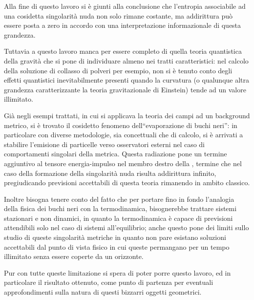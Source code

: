 Alla fine di questo  lavoro  si \`e giunti alla conclusione che l'entropia associabile ad una cosidetta singolarit\`a nuda non solo rimane costante, ma addirittura pu\`o essere posta a zero in accordo con una interpretazione informazionale di questa grandezza.
\par
Tuttavia a questo lavoro manca per essere completo di quella teoria quantistica della gravit\`a che si pone di individuare almeno nei tratti caratteristici: nel calcolo della soluzione di collasso di polveri per esempio, non si \`e tenuto conto degli effetti quantistici inevitabilmente presenti quando la curvatura (o qualunque altra grandezza caratterizzante la teoria gravitazionale di Einstein) tende ad un valore illimitato.
\par
Gi\`a negli esempi trattati, in cui si applicava la teoria dei campi ad un background metrico, si \`e trovato il cosidetto fenomeno dell``evaporazione di buchi neri'': in particolare con diverse metodologie, sia concettuali che di calcolo, si \`e arrivati a stabilire l'emisione di particelle verso osservatori esterni nel caso di comportamenti singolari della metrica. Questa radiazione pone un termine aggiuntivo al tensore energia-impulso nel membro destro della \EqEi, termine che nel caso della formazione della singolarit\`a nuda risulta addirittura infinito, pregiudicando previsioni accettabili di questa teoria rimanendo in ambito classico.
\par
Inoltre bisogna tenere conto del fatto che per portare fino in fondo l'analogia della fisica dei buchi neri con la termodinamica, bisognerebbe trattare sistemi stazionari e non dinamici, in quanto la termodinamica \`e capace di previsioni attendibili solo nel caso di sistemi all'equilibrio; anche questo pone dei limiti sullo studio di queste singolarit\`a metriche in quanto non pare esistano soluzioni accettabili dal punto di vista fisico in cui queste permangano per un tempo illimitato senza essere coperte da un orizzonte.
\par
Pur con tutte queste limitazione si spera di poter porre questo lavoro, ed in particolare il risultato ottenuto, come punto di partenza per eventuali approfondimenti sulla natura di questi bizzarri oggetti geometrici.
